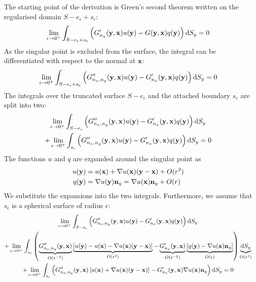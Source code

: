 \documentclass[a4paper,11pt]{article}
\newcommand{\td}{\mathrm{d}}
\begin{document}
The starting point of the derivation is Green's second theorem written on the regularised domain $S-e_{\epsilon}+s_{\epsilon}$:
%
\begin{equation}
\lim_{\epsilon \to 0^+}
\int_{S-e_{\epsilon}+s_{\epsilon}}
\left(
G'_{n_y}({\bf y}, {\bf x}) u({\bf y}) - G({\bf y}, {\bf x}) q({\bf y})
\right) 
\td S_y = 0
\end{equation}
%
As the singular point is excluded from the surface, the integral can be differentiated with respect to the normal at ${\bf x}$:
%
\begin{equation}
\lim_{\epsilon \to 0^+}
\int_{S-e_{\epsilon}+s_{\epsilon}}
\left(
G''_{n_x,n_y}({\bf y}, {\bf x}) u({\bf y}) - G'_{n_x}({\bf y}, {\bf x}) q({\bf y})
\right)
\td S_y = 0
\end{equation}
%
The integrals over the truncated surface $S-e_{\epsilon}$ and the attached boundary $s_{\epsilon}$ are split into two:
%
\begin{multline}
\lim_{\epsilon \to 0^+}
\int_{S-e_{\epsilon}}
\left(
G''_{n_x,n_y}({\bf y}, {\bf x}) u({\bf y}) - G'_{n_x}({\bf y}, {\bf x}) q({\bf y})
\right)
\td S_y
\\
+
\lim_{\epsilon \to 0^+}
\int_{s_{\epsilon}}
\left(
G''_{n_x,n_y}({\bf y}, {\bf x}) u({\bf y}) - G'_{n_x}({\bf y}, {\bf x}) q({\bf y})
\right)
\td S_y = 0
\end{multline}
%
The functions $u$ and $q$ are expanded around the singular point as
%
\begin{align}
u({\bf y}) &= u({\bf x}) + \nabla u({\bf x}) ({\bf y} - {\bf x}) + O(r^2) \nonumber \\
q({\bf y}) &= \nabla u({\bf y}) {\bf n}_y = \nabla u({\bf x}) {\bf n}_y + O(r)
\end{align}
%
We substitute the expansions into the two integrals. Furthermore, we assume that $s_{\epsilon}$ is a spherical surface of radius $\epsilon$:
%
\begin{multline}
\lim_{\epsilon \to 0^+}
\int_{S-e_{\epsilon}}
\left(
G''_{n_x,n_y}({\bf y}, {\bf x}) u({\bf y})
- G'_{n_x}({\bf y}, {\bf x}) q({\bf y})
\right)
\td S_y
\\
+
\lim_{\epsilon \to 0^+}
\int_{s_{\epsilon}}
\left(
\underbrace{G''_{n_x,n_y}({\bf y}, {\bf x})}_{O(\epsilon^{-3})} \underbrace{\left[u({\bf y}) - u({\bf x}) - \nabla u({\bf x}) ({\bf y} - {\bf x})\right]}_{O(\epsilon^2)}
- \underbrace{G'_{n_x}({\bf y}, {\bf x})}_{O(\epsilon^{-2})} \underbrace{\left[q({\bf y}) - \nabla u({\bf x}) {\bf n}_y\right]}_{O(\epsilon)}
\right)
\underbrace{\td S_y}_{O(\epsilon^2)}
\\
+
\lim_{\epsilon \to 0^+}
\int_{s_{\epsilon}}
\left(
G''_{n_x,n_y}({\bf y}, {\bf x}) \left[u({\bf x}) + \nabla u({\bf x}) ({\bf y} - {\bf x})\right]
- G'_{n_x}({\bf y}, {\bf x}) \nabla u({\bf x}) {\bf n}_y
\right)
\td S_y = 0
\end{multline}
\end{document}
